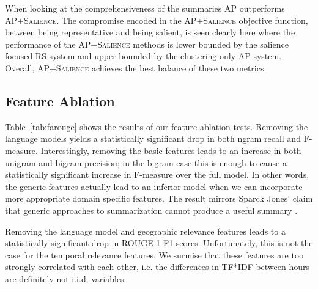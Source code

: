 When looking at the comprehensiveness of the summaries \textsc{AP} outperforms
\textsc{AP+Salience}. The compromise encoded in the \textsc{AP+Salience} 
objective function, between being representative and being salient, is seen 
clearly here where the performance of the \textsc{AP+Salience} methods is 
lower bounded by the salience focused \textsc{RS} system and upper bounded by 
the clustering only \textsc{AP} system. Overall, \textsc{AP+Salience} achieves
the best balance of these two metrics.


\subsection{Feature Ablation}



Table~\ref{tab:farouge} shows the results of our feature ablation tests. 
Removing the language models yields a statistically significant drop in both 
ngram recall and F-measure. Interestingly, removing the basic features leads 
to an increase in both unigram and bigram precision; in the bigram case this 
is enough to cause a statistically significant increase in F-measure over the 
full model. In other words, the generic features actually lead to an inferior 
model when we can incorporate more appropriate domain specific features.
The result mirrors Sparck Jones' claim that generic approaches to 
summarization cannot produce a useful summary \cite{ksj98}.





Removing the language model and geographic relevance features leads to a
statistically significant drop in ROUGE-1 F1 scores. Unfortunately,
this is not the case for the temporal relevance features. We surmise that
these features are too strongly correlated with each other, 
i.e. the differences in TF*IDF between hours are definitely not i.i.d. 
variables. 
